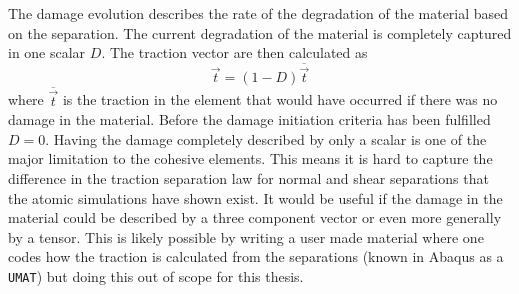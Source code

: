\documentclass[generate_interface_elements.tex]{subfiles}
\begin{document}
The damage evolution describes the rate of the degradation of the material based on the separation. The current degradation of the material is completely captured in one scalar $D$. The traction vector are then calculated as 
%
\[ \vec{t} = (1 - D) \overline{\vec{t}} \]
%
 where $\overline{\vec{t}}$ is the traction in the element that would have occurred if there was no damage in the material. Before the damage initiation criteria has been fulfilled $D = 0$. Having the damage completely described by only a scalar is one of the major limitation to the cohesive elements. This means it is hard to capture the difference in the traction separation law for normal and shear separations that the atomic simulations have shown exist. It would be useful if the damage in the material could be described by a three component vector or even more generally by a tensor. This is likely possible by writing a user made material where one codes how the traction is calculated from the separations (known in Abaqus as a \texttt{UMAT}) but doing this out of scope for this thesis.
\end{document}
